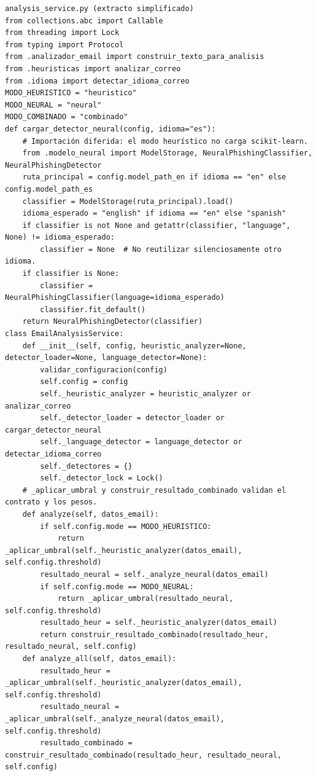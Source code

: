 \documentclass[11pt,a4paper,oneside]{report}
\begin{document}
\begin{lstlisting}
analysis_service.py (extracto simplificado)
from collections.abc import Callable
from threading import Lock
from typing import Protocol
from .analizador_email import construir_texto_para_analisis
from .heuristicas import analizar_correo
from .idioma import detectar_idioma_correo
MODO_HEURISTICO = "heuristico"
MODO_NEURAL = "neural"
MODO_COMBINADO = "combinado"
def cargar_detector_neural(config, idioma="es"):
    # Importación diferida: el modo heurístico no carga scikit-learn.
    from .modelo_neural import ModelStorage, NeuralPhishingClassifier, NeuralPhishingDetector
    ruta_principal = config.model_path_en if idioma == "en" else config.model_path_es
    classifier = ModelStorage(ruta_principal).load()
    idioma_esperado = "english" if idioma == "en" else "spanish"
    if classifier is not None and getattr(classifier, "language", None) != idioma_esperado:
        classifier = None  # No reutilizar silenciosamente otro idioma.
    if classifier is None:
        classifier = NeuralPhishingClassifier(language=idioma_esperado)
        classifier.fit_default()
    return NeuralPhishingDetector(classifier)
class EmailAnalysisService:
    def __init__(self, config, heuristic_analyzer=None, detector_loader=None, language_detector=None):
        validar_configuracion(config)
        self.config = config
        self._heuristic_analyzer = heuristic_analyzer or analizar_correo
        self._detector_loader = detector_loader or cargar_detector_neural
        self._language_detector = language_detector or detectar_idioma_correo
        self._detectores = {}
        self._detector_lock = Lock()
    # _aplicar_umbral y construir_resultado_combinado validan el contrato y los pesos.
    def analyze(self, datos_email):
        if self.config.mode == MODO_HEURISTICO:
            return _aplicar_umbral(self._heuristic_analyzer(datos_email), self.config.threshold)
        resultado_neural = self._analyze_neural(datos_email)
        if self.config.mode == MODO_NEURAL:
            return _aplicar_umbral(resultado_neural, self.config.threshold)
        resultado_heur = self._heuristic_analyzer(datos_email)
        return construir_resultado_combinado(resultado_heur, resultado_neural, self.config)
    def analyze_all(self, datos_email):
        resultado_heur = _aplicar_umbral(self._heuristic_analyzer(datos_email), self.config.threshold)
        resultado_neural = _aplicar_umbral(self._analyze_neural(datos_email), self.config.threshold)
        resultado_combinado = construir_resultado_combinado(resultado_heur, resultado_neural, self.config)

\end{lstlisting}
\end{document}
